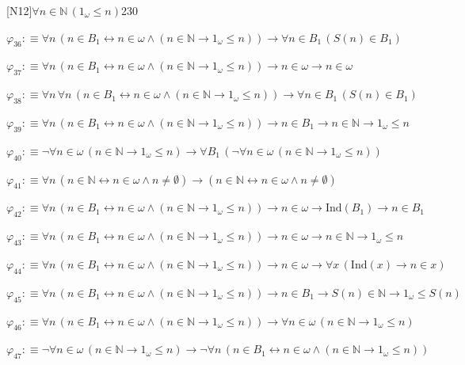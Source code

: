 \begin{fullproof}{[N12]}{$\forall n \in \mathbb{N}\,(1_{\omega} \leq n)$}{230}
\begin{abbrevlist}
\item $\varphi_{36} :\equiv \forall n\,(n \in B_{1} \leftrightarrow n \in \omega \land (n \in \mathbb{N} \to 1_{\omega} \leq n)) \to \forall n \in B_{1}\,(S(n) \in B_{1})$
\item $\varphi_{37} :\equiv \forall n\,(n \in B_{1} \leftrightarrow n \in \omega \land (n \in \mathbb{N} \to 1_{\omega} \leq n)) \to n \in \omega \to n \in \omega$
\item $\varphi_{38} :\equiv \forall n\,\forall n\,(n \in B_{1} \leftrightarrow n \in \omega \land (n \in \mathbb{N} \to 1_{\omega} \leq n)) \to \forall n \in B_{1}\,(S(n) \in B_{1})$
\item $\varphi_{39} :\equiv \forall n\,(n \in B_{1} \leftrightarrow n \in \omega \land (n \in \mathbb{N} \to 1_{\omega} \leq n)) \to n \in B_{1} \to n \in \mathbb{N} \to 1_{\omega} \leq n$
\item $\varphi_{40} :\equiv \neg \forall n \in \omega\,(n \in \mathbb{N} \to 1_{\omega} \leq n) \to \forall B_{1}\,(\neg \forall n \in \omega\,(n \in \mathbb{N} \to 1_{\omega} \leq n))$
\item $\varphi_{41} :\equiv \forall n\,(n \in \mathbb{N} \leftrightarrow n \in \omega \land n \neq \emptyset) \to (n \in \mathbb{N} \leftrightarrow n \in \omega \land n \neq \emptyset)$
\item $\varphi_{42} :\equiv \forall n\,(n \in B_{1} \leftrightarrow n \in \omega \land (n \in \mathbb{N} \to 1_{\omega} \leq n)) \to n \in \omega \to \mathrm{Ind}(B_{1}) \to n \in B_{1}$
\item $\varphi_{43} :\equiv \forall n\,(n \in B_{1} \leftrightarrow n \in \omega \land (n \in \mathbb{N} \to 1_{\omega} \leq n)) \to n \in \omega \to n \in \mathbb{N} \to 1_{\omega} \leq n$
\item $\varphi_{44} :\equiv \forall n\,(n \in B_{1} \leftrightarrow n \in \omega \land (n \in \mathbb{N} \to 1_{\omega} \leq n)) \to n \in \omega \to \forall x\,(\mathrm{Ind}(x) \to n \in x)$
\item $\varphi_{45} :\equiv \forall n\,(n \in B_{1} \leftrightarrow n \in \omega \land (n \in \mathbb{N} \to 1_{\omega} \leq n)) \to n \in B_{1} \to S(n) \in \mathbb{N} \to 1_{\omega} \leq S(n)$
\item $\varphi_{46} :\equiv \forall n\,(n \in B_{1} \leftrightarrow n \in \omega \land (n \in \mathbb{N} \to 1_{\omega} \leq n)) \to \forall n \in \omega\,(n \in \mathbb{N} \to 1_{\omega} \leq n)$
\item $\varphi_{47} :\equiv \neg \forall n \in \omega\,(n \in \mathbb{N} \to 1_{\omega} \leq n) \to \neg \forall n\,(n \in B_{1} \leftrightarrow n \in \omega \land (n \in \mathbb{N} \to 1_{\omega} \leq n))$

\end{abbrevlist}
\end{fullproof}
